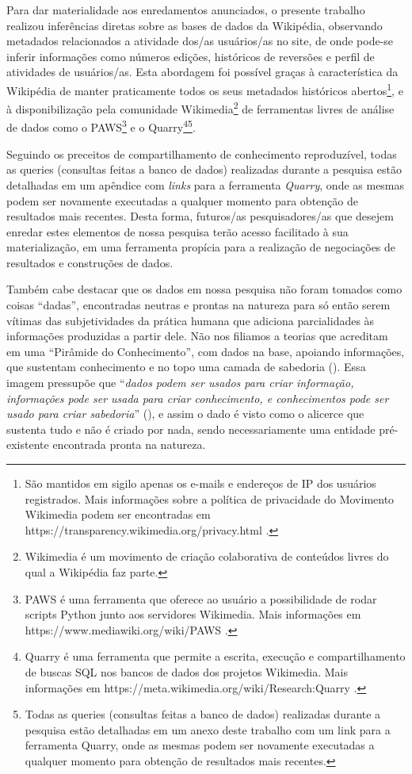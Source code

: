Para dar materialidade aos enredamentos anunciados, o presente trabalho realizou inferências diretas sobre as bases de dados da Wikipédia, observando metadados relacionados a atividade dos/as usuários/as no site, de onde pode-se inferir informações como números edições, históricos de reversões e perfil de atividades de usuários/as. Esta abordagem foi possível graças à característica da Wikipédia de manter praticamente todos os seus metadados históricos abertos\footnote{São mantidos em sigilo apenas os e-mails e endereços de IP dos usuários registrados. Mais informações sobre a política de privacidade do Movimento Wikimedia podem ser encontradas em https://transparency.wikimedia.org/privacy.html .}, e à disponibilização pela comunidade Wikimedia\footnote{Wikimedia é um movimento de criação colaborativa de conteúdos livres do qual a Wikipédia faz parte.} de ferramentas livres de análise de dados como o PAWS\footnote{PAWS é uma ferramenta que oferece ao usuário a possibilidade de rodar scripts Python junto aos servidores Wikimedia. Mais informações em https://www.mediawiki.org/wiki/PAWS .} e o Quarry\footnote{Quarry é uma ferramenta que permite a escrita, execução e compartilhamento de buscas SQL nos bancos de dados dos projetos Wikimedia. Mais informações em https://meta.wikimedia.org/wiki/Research:Quarry .}\footnote{Todas as queries (consultas feitas a banco de dados) realizadas durante a pesquisa estão detalhadas em um anexo deste trabalho com um link para a ferramenta Quarry, onde as mesmas podem ser novamente executadas a qualquer momento para obtenção de resultados mais recentes.}.

Seguindo os preceitos de compartilhamento de conhecimento reproduzível, todas as queries (consultas feitas a banco de dados) realizadas durante a pesquisa estão detalhadas em um apêndice com \textit{links} para a ferramenta \textit{Quarry}, onde as mesmas podem ser novamente executadas a qualquer momento para obtenção de resultados mais recentes. Desta forma, futuros/as pesquisadores/as que desejem enredar estes elementos de nossa pesquisa terão acesso facilitado à sua materialização, em uma ferramenta propícia para a realização de negociações de resultados e construções de dados.

Também cabe destacar que os dados em nossa pesquisa não foram tomados como coisas ``dadas'', encontradas neutras e prontas na natureza para só então serem vítimas das subjetividades da prática humana que adiciona parcialidades às informações produzidas a partir dele.  Não nos filiamos a teorias que acreditam em uma ``Pirâmide do Conhecimento'', com dados na base, apoiando informações, que sustentam conhecimento e no topo uma camada de sabedoria (\cite{ackoff_data_1989}). Essa imagem pressupõe que ``\textit{dados podem ser usados para criar informação, informações pode ser usada para criar conhecimento, e conhecimentos pode ser usado para criar sabedoria}'' (\cite[164]{rowley_dikw_wisdom_2007}), e assim o dado é visto como o alicerce que sustenta tudo e não é criado por nada, sendo necessariamente uma entidade pré-existente encontrada pronta na natureza.

